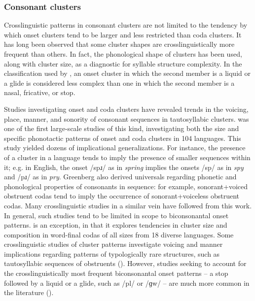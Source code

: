 \subsubsection{{Consonant} {clusters}}\label{sec:1.1.2.3}

  Crosslinguistic patterns in consonant clusters are not limited to the tendency by which onset clusters tend to be larger and less restricted than coda clusters. It has long been observed that some cluster shapes are crosslinguistically more frequent than others. In fact, the phonological shape of clusters has been used, along with cluster size, as a diagnostic for syllable structure complexity. In the classification used by \citet{Maddieson2013a}, an onset cluster in which the second member is a liquid or a glide is considered less complex than one in which the second member is a nasal, fricative, or stop.

  Studies investigating onset and coda clusters have revealed trends in the voicing, place, manner, and sonority of consonant sequences in tautosyllabic clusters. \citet{Greenberg19651978} was one of the first large-scale studies of this kind, investigating both the size and specific phonotactic patterns of onset and coda clusters in 104 languages. This study yielded dozens of implicational generalizations. For instance, the presence of a cluster in a language tends to imply the presence of smaller sequences within it; e.g. in English, the onset /spɹ/ as in \textit{spring} implies the onsets /sp/ as in \textit{spy} and /pɹ/ as in \textit{pry}. Greenberg also derived universals regarding phonetic and phonological properties of consonants in sequence: for example, sonorant+voiced obstruent codas tend to imply the occurrence of sonorant+voiceless obstruent codas. Many crosslinguistic studies in a similar vein have followed from this work. In general, such studies tend to be limited in scope to biconsonantal onset patterns. \citet{VanDam2004} is an exception, in that it explores tendencies in cluster size and composition in word-final codas of all sizes from 18 diverse languages. Some crosslinguistic studies of cluster patterns investigate voicing and manner implications regarding patterns of typologically rare structures, such as tautosyllabic sequences of obstruents (\citealt{Morelli1999,Morelli2003,Kreitman2008}). However, studies seeking to account for the crosslinguistically most frequent biconsonantal onset patterns -- a stop followed by a liquid or a glide, such as /pl/ or /ɡw/ -- are much more common in the literature (\citealt{Clements1990,BerentEtAl2008,BerentEtAl2011,Parker2012,Vennemann2012}). 

